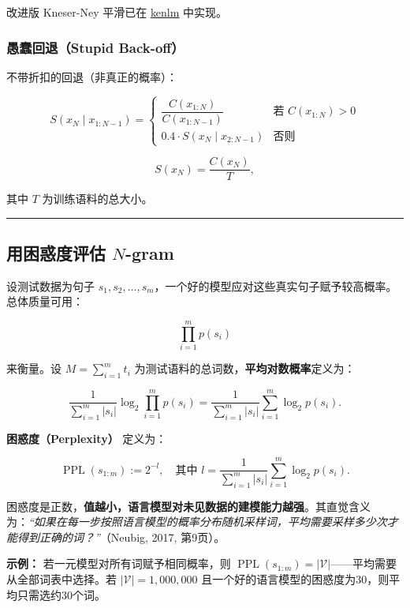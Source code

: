\documentclass[
  11pt,
  a4paper,
]{article}
\begin{document}
改进版 Kneser-Ney 平滑已在 \href{https://github.com/kpu/kenlm}{kenlm}
中实现。

\subsubsection{愚蠢回退（Stupid
Back-off）}\label{ux611aux8822ux56deux9000stupid-back-off}

不带折扣的回退（非真正的概率）：

\[S(x_N \mid x_{1:N-1}) = \begin{cases} \dfrac{C(x_{1:N})}{C(x_{1:N-1})} & \text{若 } C(x_{1:N}) > 0 \\ 0.4 \cdot S(x_N \mid x_{2:N-1}) & \text{否则} \end{cases}\]

\[S(x_N) = \frac{C(x_N)}{T},\]

其中 \(T\) 为训练语料的总大小。

\begin{center}\rule{0.5\linewidth}{0.5pt}\end{center}

\subsection{\texorpdfstring{用困惑度评估
\(N\)-gram}{用困惑度评估 N-gram}}\label{ux7528ux56f0ux60d1ux5ea6ux8bc4ux4f30-n-gram}

设测试数据为句子
\(s_1, s_2, \ldots, s_m\)，一个好的模型应对这些真实句子赋予较高概率。总体质量可用：

\[\prod_{i=1}^m p(s_i)\]

来衡量。设 \(M = \sum_{i=1}^m t_i\)
为测试语料的总词数，\textbf{平均对数概率}定义为：

\[\frac{1}{\sum_{i=1}^m |s_i|} \log_2 \prod_{i=1}^m p(s_i) = \frac{1}{\sum_{i=1}^m |s_i|} \sum_{i=1}^m \log_2 p(s_i).\]

\textbf{困惑度（Perplexity）} 定义为：

\[\operatorname{PPL}(s_{1:m}) := 2^{-l}, \quad \text{其中 } l = \frac{1}{\sum_{i=1}^m |s_i|} \sum_{i=1}^m \log_2 p(s_i).\]

困惑度是正数，\textbf{值越小，语言模型对未见数据的建模能力越强}。其直觉含义为：\emph{``如果在每一步按照语言模型的概率分布随机采样词，平均需要采样多少次才能得到正确的词？''}（Neubig,
2017, 第9页）。

\textbf{示例：} 若一元模型对所有词赋予相同概率，则
\(\operatorname{PPL}(s_{1:m}) = |\mathcal{V}|\)------平均需要从全部词表中选择。若
\(|\mathcal{V}| = 1{,}000{,}000\)
且一个好的语言模型的困惑度为30，则平均只需选约30个词。
\end{document}
